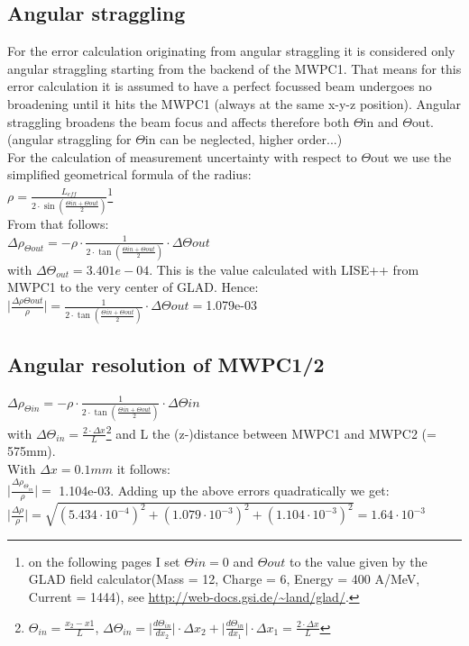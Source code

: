 \documentclass[12pt, letterpaper]{article}
\begin{document}
\subsection{Angular straggling}
For the error calculation originating from angular straggling it is considered only angular straggling starting from the backend of the MWPC1. That means for this error calculation it is assumed to have a perfect focussed beam undergoes no broadening until it hits the MWPC1 (always at the same x-y-z position). Angular straggling broadens the beam focus and affects therefore both $\Theta$\textunderscore in and $\Theta$\textunderscore out. \\
(angular straggling for $\Theta$\textunderscore in can be neglected, higher order...)\\
For the calculation of  measurement uncertainty with respect to $\Theta$\textunderscore out we use the simplified geometrical formula of the radius:\\
$\rho = \frac{L_{eff}}{2\cdot\sin(\frac{\Theta{in}+\Theta{out}}{2})}$\footnote{on the following pages I set $\Theta{in} = 0$ and $\Theta{out}$ to the value given by the GLAD field calculator(Mass = 12, Charge = 6, Energy = 400 A/MeV, Current = 1444), see \url{http://web-docs.gsi.de/~land/glad/}.}\\ 
From that follows:\\
$\Delta\rho_{\Theta{out}} = -\rho\cdot \frac{1}{2\cdot\tan(\frac{\Theta{in}+\Theta{out}}{2})}\cdot\Delta\Theta{out}$\\
with $\Delta\Theta_{out} = 3.401e-04$. This is the value calculated with LISE++ from MWPC1 to the very center of GLAD. 
Hence:\\
$\Big|\frac{\Delta\rho{\Theta{out}}}{\rho}\Big| = \frac{1}{2\cdot\tan(\frac{\Theta{in}+\Theta{out}}{2})}\cdot\Delta\Theta{out} = $1.079e-03

\subsection{Angular resolution of MWPC1/2}
$\Delta\rho_{\Theta{in}} = -\rho\cdot \frac{1}{2\cdot\tan(\frac{\Theta{in}+\Theta{out}}{2})}\cdot\Delta\Theta{in}$ \\
with $\Delta\Theta_{in} = \frac{2\cdot \Delta x}{L} $\footnote{$\Theta_{in} = \frac{x_{2}-x{1}}{L}$, $\Delta\Theta_{in} = \big|\frac{d\Theta_{in}}{dx_{2}} \big|\cdot \Delta x_{2} + \big|\frac{d\Theta_{in}}{dx_{1}} \big|\cdot \Delta x_{1} = \frac{2\cdot \Delta x}{L}$} and L the (z-)distance between MWPC1 and MWPC2 (= 575mm).\\
\newline
With $\Delta x = 0.1mm$ it follows:\\
\newline
$\Big|\frac{\Delta\rho_{\Theta_{in}}}{\rho}\Big| = $ 1.104e-03.
\newline
\newline
Adding up the above errors quadratically we get:\\
$\Big|\frac{\Delta\rho}{\rho}\Big| = \sqrt{(5.434\cdot10^{-4})^{2}+(1.079\cdot10^{-3})^{2}+(1.104\cdot10^{-3})^{2}} = 1.64\cdot10^{-3} $
\end{document}
